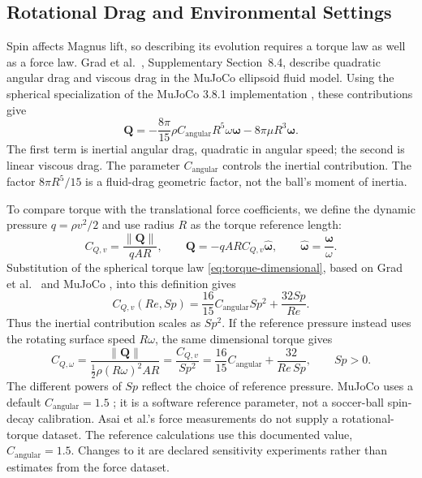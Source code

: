 \documentclass[12pt,letterpaper]{article}
\begin{document}
\subsection{Rotational Drag and Environmental Settings}\label{sec:rotation}
Spin affects Magnus lift, so describing its evolution requires a torque law as well as a force law. Grad et al.\ \cite{grad2026}, Supplementary Section~8.4, describe quadratic angular drag and viscous drag in the MuJoCo ellipsoid fluid model. Using the spherical specialization of the MuJoCo 3.8.1 implementation \cite{mujoco381}, these contributions give
\begin{equation}
\boldsymbol Q=-\frac{8\pi}{15}\rho C_{\mathrm{angular}}R^5
\omega\boldsymbol\omega-8\pi\mu R^3\boldsymbol\omega.
\label{eq:torque-dimensional}\end{equation}
The first term is inertial angular drag, quadratic in angular speed; the second is linear viscous drag. The parameter $C_{\mathrm{angular}}$ controls the inertial contribution. The factor $8\pi R^5/15$ is a fluid-drag geometric factor, not the ball's moment of inertia.

To compare torque with the translational force coefficients, we define the dynamic pressure $q=\rho v^2/2$ and use radius $R$ as the torque reference length:
\begin{equation}
C_{Q,v}=\frac{\|\boldsymbol Q\|}{qAR},\qquad
\boldsymbol Q=-qAR C_{Q,v}\widehat{\boldsymbol\omega},\qquad
\widehat{\boldsymbol\omega}=\frac{\boldsymbol\omega}{\omega}.
\label{eq:cq-definition}\end{equation}
Substitution of the spherical torque law \eqref{eq:torque-dimensional}, based on Grad et al.\ \cite{grad2026} and MuJoCo \cite{mujoco381}, into this definition gives
\begin{equation}
C_{Q,v}(Re,Sp)=\frac{16}{15}C_{\mathrm{angular}}Sp^2+\frac{32Sp}{Re}.
\label{eq:cq-full}\end{equation}
Thus the inertial contribution scales as $Sp^2$. If the reference pressure instead uses the rotating surface speed $R\omega$, the same dimensional torque gives
\begin{equation}
C_{Q,\omega}=\frac{\|\boldsymbol Q\|}{\tfrac12\rho(R\omega)^2AR}
=\frac{C_{Q,v}}{Sp^2}
=\frac{16}{15}C_{\mathrm{angular}}+\frac{32}{Re\,Sp},\qquad Sp>0.
\label{eq:cq-rotation}\end{equation}
The different powers of $Sp$ reflect the choice of reference pressure. MuJoCo uses a default $C_{\mathrm{angular}}=1.5$ \cite{mujoco381}; it is a software reference parameter, not a soccer-ball spin-decay calibration. Asai et al.'s force measurements \cite{asai2007} do not supply a rotational-torque dataset. The reference calculations use this documented value, $C_{\mathrm{angular}}=1.5$. Changes to it are declared sensitivity experiments rather than estimates from the force dataset.
\end{document}
